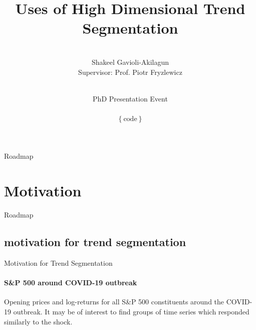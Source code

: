 \documentclass{beamer}
\title[Trend Segmentation]{Uses of High Dimensional Trend Segmentation}
\institute[LSE Department of Statistics]{}
\author[]{
\\
  {Shakeel Gavioli-Akilagun} \\
  \footnotesize{Supervisor: Prof. Piotr Fryzlewicz}
}
\date[02 June 2020]{
  \hspace{1cm}\\
  PhD Presentation Event\\
  \hspace{1cm}\\
  {\fontfamily{pcr}\selectfont \href{https://github.com/Shakeel95/PhD-Presentation-1}{$\left \{ \text{code} \right \}$}}
}
\begin{document}

\begin{frame}
  \titlepage
\end{frame}




\begin{frame}{Roadmap}
  \tableofcontents
\end{frame}




\section{Motivation}




\begin{frame}{Roadmap}
\tableofcontents[currentsection]
\end{frame}



\subsection{motivation for trend segmentation}




\begin{frame}{Motivation for Trend Segmentation}
\framesubtitle{S\&P 500 around COVID-19 outbreak}

Opening prices and log-returns for all S\&P 500 constituents around the COVID-19 outbreak. It may be of interest to find groups of time series which responded similarly to the shock.

\begin{figure}[H]
    \centering
    \begin{subfigure}
        \texttt{[image: ../plots/SnP500\_raw\_COVID.png]}
    \end{subfigure}
    \begin{subfigure}
        \texttt{[image: ../plots/SnP500\_LR\_COVID.png]}
    \end{subfigure}
\end{figure}

\end{frame}
\end{document}
